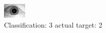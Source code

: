 \begin{figure}[h!]
\begin{center}
\includegraphics[width=0.60\columnwidth]{figures/ID1633_class_3_target_2.png}
\end{center}
\caption{ Classification: 3 actual target: 2}
\label{fig:ID1633_class_3_target_2}
\end{figure}
